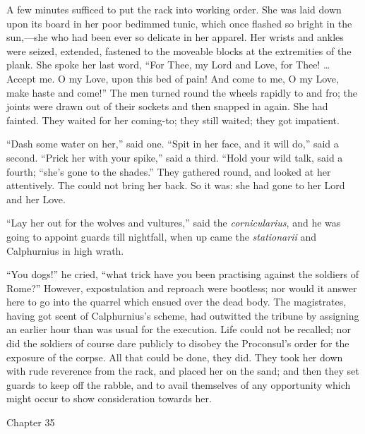 A few minutes sufficed to put the rack into working order. She was
laid down upon its board in her poor bedimmed tunic, which once
flashed so bright in the sun,—she who had been ever so delicate in
her apparel. Her wrists and ankles were seized, extended, fastened to
the moveable blocks at the extremities of the plank. She spoke her
last word, ``For Thee, my Lord and Love, for Thee! … Accept me.
O my Love, upon this bed of pain! And come to me, O my Love, make
haste and come!'' The men turned round the wheels rapidly to and
fro; the joints were drawn out of their sockets and then snapped in
again. She had fainted. They waited for her coming-to; they still
waited; they got impatient.

``Dash some water on her,'' said one. ``Spit in her
face, and it will do,'' said a second. ``Prick her with your
spike,'' said a third. ``Hold your wild talk, said a fourth;
``she's gone to the shades.'' They gathered round, and looked
at her attentively. The could not bring her back. So it was: she had
gone to her Lord and her Love.

``Lay her out for the wolves and vultures,'' said the \emph{cornicularius},
and he was going to appoint guards till nightfall, when up came the \emph{stationarii}
and Calphurnius in high wrath.

``You dogs!'' he cried, ``what trick have you been
practising against the soldiers of Rome?'' However, expostulation
and reproach were bootless; nor would it answer here to go into the
quarrel which ensued over the dead body. The magistrates, having got
scent of Calphurnius's scheme, had outwitted the tribune by assigning
an earlier hour than was usual for the execution. Life could not be
recalled; nor did the soldiers of course dare publicly to disobey the
Proconsul's order for the exposure of the corpse. All that could be
done, they did. They took her down with rude reverence from the rack,
and placed her on the sand; and then they set guards to keep off the
rabble, and to avail themselves of any opportunity which might occur
to show consideration towards her.

Chapter 35


